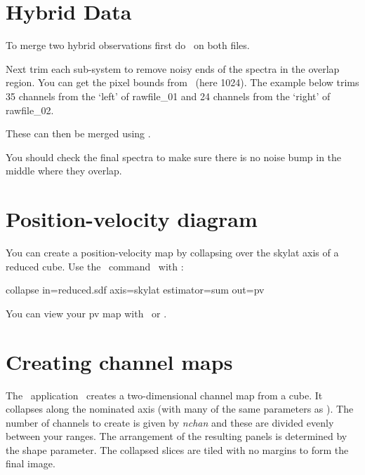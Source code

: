 \documentclass[11pt,oneside,chapters]{starlink}
\begin{document}
\section{Hybrid Data}

To merge two hybrid observations first do \wcsalign\ on both files.
\begin{terminalv}
\end{terminalv}
Next trim each sub-system to remove noisy ends of the spectra in the
overlap region. You can get the pixel bounds from \ndftrace\ (here
1024). The example below trims 35 channels from the `left' of
rawfile\_01 and 24 channels from the `right' of rawfile\_02.
\begin{terminalv}
\end{terminalv}
These can then be merged using \wcsmosaic.
\begin{terminalv}
\end{terminalv}
You should check the final spectra to make sure there is no noise bump
in the middle where they overlap.

\section{Position-velocity diagram}

You can create a position-velocity map by collapsing over the skylat
axis of a reduced cube. Use the \Kappa\ command \collapse\ with
:

\begin{terminalv}
collapse in=reduced.sdf axis=skylat estimator=sum out=pv
\end{terminalv}
You can view your pv map with  \gaia\ or \display.

\section{Creating channel maps}
\label{sec:channel}

The \Kappa\ application \chanmap\ creates a two-dimensional channel
map from a cube. It collapses along the nominated axis (with many of
the same parameters as \collapse). The number of channels to create is
given by \textit{nchan} and these are divided evenly between your
ranges. The arrangement of the resulting panels is determined by the
shape parameter. The collapsed slices are tiled with no margins to
form the final image.
\end{document}
